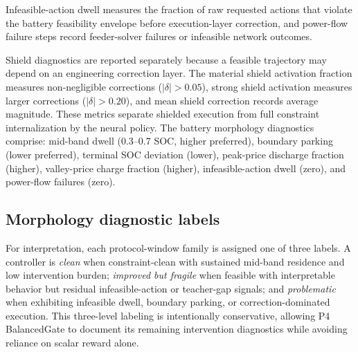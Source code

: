 Infeasible-action dwell measures the fraction of raw requested actions that violate the battery feasibility envelope before execution-layer correction, and power-flow failure steps record feeder-solver failures or infeasible network outcomes.

Shield diagnostics are reported separately because a feasible trajectory may depend on an engineering correction layer. The material shield activation fraction measures non-negligible corrections ($|\delta| > 0.05$), strong shield activation measures larger corrections ($|\delta| > 0.20$), and mean shield correction records average magnitude. These metrics separate shielded execution from full constraint internalization by the neural policy. The battery morphology diagnostics comprise: mid-band dwell (0.3--0.7 SOC, higher preferred), boundary parking (lower preferred), terminal SOC deviation (lower), peak-price discharge fraction (higher), valley-price charge fraction (higher), infeasible-action dwell (zero), and power-flow failures (zero).

\subsection{Morphology diagnostic labels}

For interpretation, each protocol-window family is assigned one of three labels. A controller is \emph{clean} when constraint-clean with sustained mid-band residence and low intervention burden; \emph{improved but fragile} when feasible with interpretable behavior but residual infeasible-action or teacher-gap signals; and \emph{problematic} when exhibiting infeasible dwell, boundary parking, or correction-dominated execution. This three-level labeling is intentionally conservative, allowing P4 BalancedGate to document its remaining intervention diagnostics while avoiding reliance on scalar reward alone.
